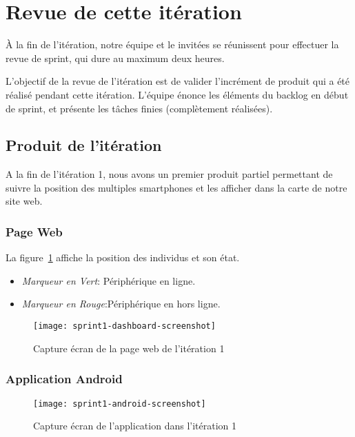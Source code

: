 \section{Revue de cette itération}

À la fin de l'itération, notre équipe et le  invitées
se réunissent pour effectuer la revue de sprint, qui dure au maximum deux
heures.

L'objectif de la revue de l'itération est de valider l'incrément de produit qui
a été réalisé pendant cette itération. L'équipe énonce les éléments du backlog
en début de sprint, et présente les tâches finies (complètement
réalisées).

\subsection{Produit de l'itération}

A la fin de l'itération 1, nous avons un premier produit partiel permettant de
suivre la position des multiples smartphones et les afficher dans la carte de
notre site web.

\subsubsection{Page Web }
La figure~\ref{fig:sprint1-dashboard-screenshot} affiche la position des
individus et son état.

\begin{itemize}
    \item \textit{Marqueur en Vert}: Périphérique en ligne.
    \item \textit{Marqueur en Rouge}:Périphérique en hors ligne.
\end{itemize}

\begin{figure}[H]
    \centering
    \texttt{[image: sprint1-dashboard-screenshot]}
    \caption{Capture écran de la page web de l'itération 1}
\label{fig:sprint1-dashboard-screenshot}
\end{figure}

\subsubsection{Application Android}

\begin{figure}[H]
    \centering
    \texttt{[image: sprint1-android-screenshot]}
    \caption{Capture écran de l'application dans l'itération 1}
\label{fig:sprint1-android-screenshot}
\end{figure}

